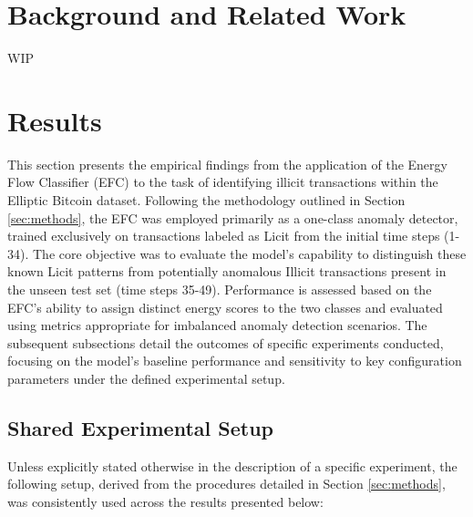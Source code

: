 \documentclass[12pt]{article}
\begin{document}
\section{Background and Related Work}
WIP

\section{Results} \label{sec:results}

This section presents the empirical findings from the application of the Energy Flow Classifier (EFC) to the task of
identifying illicit transactions within the Elliptic Bitcoin dataset. Following the methodology outlined in Section
\ref{sec:methods}, the EFC was employed primarily as a one-class anomaly detector, trained exclusively on transactions
labeled as Licit from the initial time steps (1-34). The core objective was to evaluate the model's capability to distinguish
these known Licit patterns from potentially anomalous Illicit transactions present in the unseen test set (time steps 35-49).
Performance is assessed based on the EFC's ability to assign distinct energy scores to the two classes and evaluated using
metrics appropriate for imbalanced anomaly detection scenarios. The subsequent subsections detail the outcomes of specific
experiments conducted, focusing on the model's baseline performance and sensitivity to key configuration parameters under
the defined experimental setup.

\subsection{Shared Experimental Setup} \label{subsec:shared_setup}

Unless explicitly stated otherwise in the description of a specific experiment, the following setup, derived from the procedures
detailed in Section \ref{sec:methods}, was consistently used across the results presented below:
\end{document}

